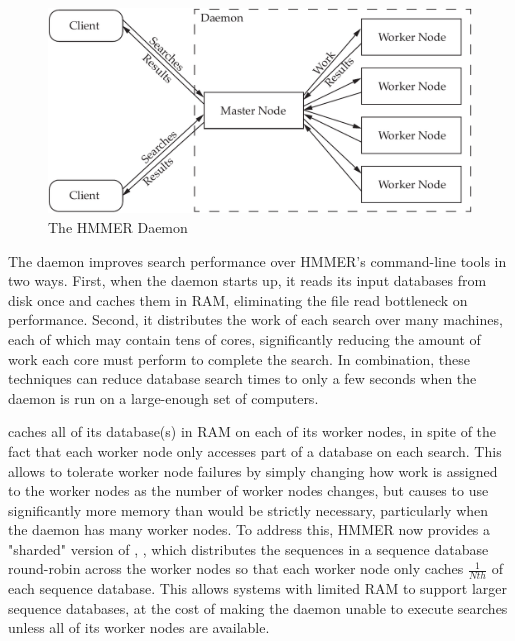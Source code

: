 \documentclass[notoc,justified]{tufte-book}    %
\begin{document}
\begin{figure}
\includegraphics[width=\textwidth]{inclusions/daemon.pdf}
\caption{The HMMER Daemon}
\label{fig:daemon}
\end{figure}

The daemon improves search performance over HMMER's command-line tools in two ways.  First, when the daemon starts up, it reads its input databases from disk once and caches them in RAM, eliminating the file read bottleneck on performance.  Second, it distributes the work of each search over many machines, each of which may contain tens of cores, significantly reducing the amount of work each core must perform to complete the search.  In combination, these techniques can reduce database search times to only a few seconds when the daemon is run on a large-enough set of computers.  

 caches all of its database(s) in RAM on each of its worker nodes, in spite of the fact that each worker node only accesses part of a database on each search.  This allows  to tolerate worker node failures by simply changing how work is assigned to the worker nodes as the number of worker nodes changes, but causes  to use significantly more memory than would be strictly necessary, particularly when the daemon has many worker nodes.  To address this, HMMER now provides a "sharded" version of , , which distributes the sequences in a sequence database round-robin across the worker nodes so that each worker node only caches $\frac{1}{Nth}$ of each sequence database.  This allows systems with limited RAM to support larger sequence databases, at the cost of making the daemon unable to execute searches unless all of its worker nodes are available.
\end{document}
